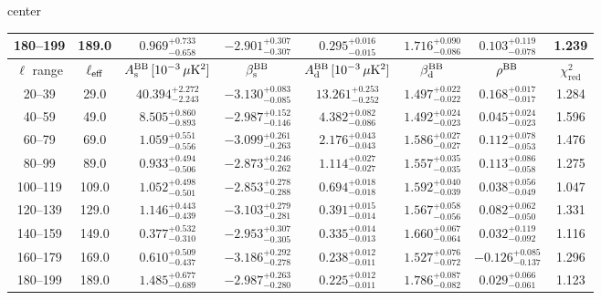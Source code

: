\begin{table}[h]
\begin{adjustbox}{center}
\begin{tabular}{cccccccc}
180--199 & 189.0 & $0.969^{+0.733}_{-0.658}$ & $-2.901^{+0.307}_{-0.307}$ & $0.295^{+0.016}_{-0.015}$ & $1.716^{+0.090}_{-0.086}$ & $0.103^{+0.119}_{-0.078}$ & 1.239 \\
\midrule
$\ell$ range & $\ell_{\rm eff}$ & $A^{\rm BB}_{\rm s}\,[10^{-3}\,\mu\mathrm{K}^2]$ & $\beta^{\rm BB}_{\rm s}$ & $A^{\rm BB}_{\rm d}\,[10^{-3}\,\mu\mathrm{K}^2]$ & $\beta^{\rm BB}_{\rm d}$ & $\rho^{\rm BB}$ & $\chi^2_\mathrm{red}$ \\
\midrule
20--39 & 29.0 & $40.394^{+2.272}_{-2.243}$ & $-3.130^{+0.083}_{-0.085}$ & $13.261^{+0.253}_{-0.252}$ & $1.497^{+0.022}_{-0.022}$ & $0.168^{+0.017}_{-0.017}$ & 1.284 \\
40--59 & 49.0 & $8.505^{+0.860}_{-0.893}$ & $-2.987^{+0.152}_{-0.146}$ & $4.382^{+0.082}_{-0.086}$ & $1.492^{+0.024}_{-0.023}$ & $0.045^{+0.024}_{-0.023}$ & 1.596 \\
60--79 & 69.0 & $1.059^{+0.551}_{-0.556}$ & $-3.099^{+0.261}_{-0.263}$ & $2.176^{+0.043}_{-0.043}$ & $1.586^{+0.027}_{-0.027}$ & $0.112^{+0.078}_{-0.053}$ & 1.476 \\
80--99 & 89.0 & $0.933^{+0.494}_{-0.506}$ & $-2.873^{+0.246}_{-0.262}$ & $1.114^{+0.027}_{-0.027}$ & $1.557^{+0.035}_{-0.035}$ & $0.113^{+0.086}_{-0.058}$ & 1.275 \\
100--119 & 109.0 & $1.052^{+0.498}_{-0.501}$ & $-2.853^{+0.278}_{-0.288}$ & $0.694^{+0.018}_{-0.018}$ & $1.592^{+0.040}_{-0.039}$ & $0.038^{+0.056}_{-0.049}$ & 1.047 \\
120--139 & 129.0 & $1.146^{+0.443}_{-0.439}$ & $-3.103^{+0.279}_{-0.281}$ & $0.391^{+0.015}_{-0.014}$ & $1.567^{+0.058}_{-0.056}$ & $0.082^{+0.062}_{-0.050}$ & 1.331 \\
140--159 & 149.0 & $0.377^{+0.532}_{-0.310}$ & $-2.953^{+0.307}_{-0.305}$ & $0.335^{+0.014}_{-0.013}$ & $1.660^{+0.067}_{-0.064}$ & $0.032^{+0.119}_{-0.092}$ & 1.116 \\
160--179 & 169.0 & $0.610^{+0.509}_{-0.437}$ & $-3.186^{+0.292}_{-0.278}$ & $0.238^{+0.012}_{-0.011}$ & $1.527^{+0.076}_{-0.072}$ & $-0.126^{+0.085}_{-0.137}$ & 1.296 \\
180--199 & 189.0 & $1.485^{+0.677}_{-0.689}$ & $-2.987^{+0.263}_{-0.280}$ & $0.225^{+0.012}_{-0.011}$ & $1.786^{+0.087}_{-0.082}$ & $0.029^{+0.066}_{-0.061}$ & 1.123 \\
\bottomrule
\end{tabular}
\end{adjustbox}
\end{table}
